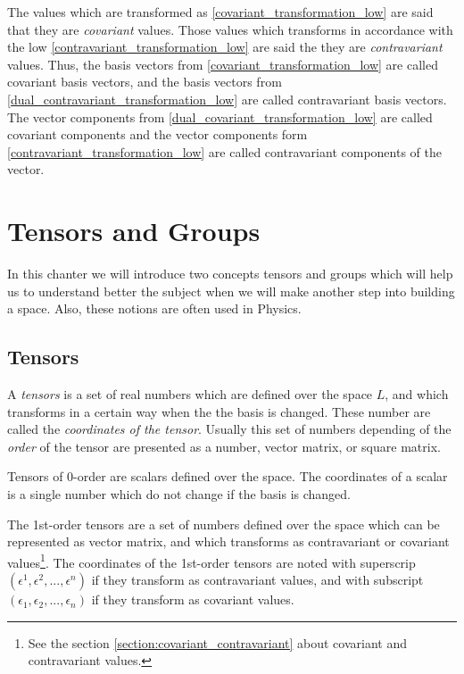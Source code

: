 \documentclass{book}
\begin{document}
The values which are transformed as \eqref{covariant_transformation_low} are said that they are \emph{covariant} values. Those values which transforms in accordance with the low \eqref{contravariant_transformation_low} are said the they are \emph{contravariant} values. Thus, the  basis vectors from \eqref{covariant_transformation_low} are called covariant basis vectors, and the basis vectors from \eqref{dual_contravariant_transformation_low} are called contravariant basis vectors. The vector components from \eqref{dual_covariant_transformation_low} are called covariant components and the vector components form \eqref{contravariant_transformation_low} are called  contravariant components of the vector.

\chapter{Tensors and Groups}

In this chanter we will introduce two concepts tensors and groups which will help us to understand better the subject when we will make another step into building a space. Also, these notions are often used in Physics.

\section{Tensors}

A \emph{tensors} is a set of real numbers which are defined over the space $L$, and which transforms in a certain way when the the basis is changed. These number are called the \emph{coordinates of the tensor}. Usually this set of numbers depending of the \emph{order} of the tensor are presented as a number, vector matrix, or square matrix.

Tensors of 0-order are scalars defined over the space. The coordinates of a scalar is a single number which do not change if the basis is changed.

The 1st-order tensors are a set of numbers defined over the space which can be represented as vector matrix, and which transforms as contravariant or covariant values\footnote{See the section \ref{section:covariant_contravariant} about covariant and contravariant values.}. The coordinates of the 1st-order tensors are noted with superscrip $(\epsilon^1, \epsilon^2,...,\epsilon^n)$ if they transform as contravariant values, and with subscript $(\epsilon_1, \epsilon_2,...,\epsilon_n)$ if they transform as covariant values.
\end{document}
